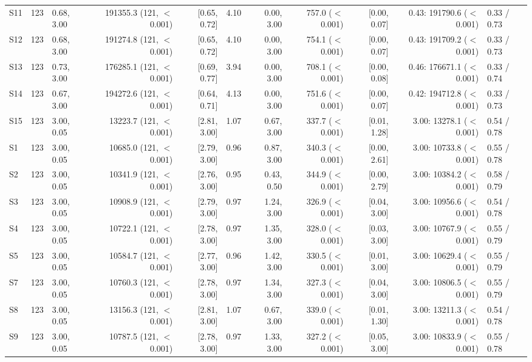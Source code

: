 \begin{tabular}{llp{4.2cm}rrrrrrrp{4.6cm}}
S11 & 123 & 0.68, 3.00 & 191355.3 (121, $<$0.001) & [0.65, 0.72] & 4.10 & 0.00, 3.00 & 757.0 ($<$0.001) & [0.00, 0.07] & 0.43: 191790.6 ($<$0.001) & 0.33 / 0.73 \\
S12 & 123 & 0.68, 3.00 & 191274.8 (121, $<$0.001) & [0.65, 0.72] & 4.10 & 0.00, 3.00 & 754.1 ($<$0.001) & [0.00, 0.07] & 0.43: 191709.2 ($<$0.001) & 0.33 / 0.73 \\
S13 & 123 & 0.73, 3.00 & 176285.1 (121, $<$0.001) & [0.69, 0.77] & 3.94 & 0.00, 3.00 & 708.1 ($<$0.001) & [0.00, 0.08] & 0.46: 176671.1 ($<$0.001) & 0.33 / 0.74 \\
S14 & 123 & 0.67, 3.00 & 194272.6 (121, $<$0.001) & [0.64, 0.71] & 4.13 & 0.00, 3.00 & 751.6 ($<$0.001) & [0.00, 0.07] & 0.42: 194712.8 ($<$0.001) & 0.33 / 0.73 \\
S15 & 123 & 3.00, 0.05 & 13223.7 (121, $<$0.001) & [2.81, 3.00] & 1.07 & 0.67, 3.00 & 337.7 ($<$0.001) & [0.01, 1.28] & 3.00: 13278.1 ($<$0.001) & 0.54 / 0.78 \\
S1 & 123 & 3.00, 0.05 & 10685.0 (121, $<$0.001) & [2.79, 3.00] & 0.96 & 0.87, 3.00 & 340.3 ($<$0.001) & [0.00, 2.61] & 3.00: 10733.8 ($<$0.001) & 0.55 / 0.78 \\
S2 & 123 & 3.00, 0.05 & 10341.9 (121, $<$0.001) & [2.76, 3.00] & 0.95 & 0.43, 0.50 & 344.9 ($<$0.001) & [0.00, 2.79] & 3.00: 10384.2 ($<$0.001) & 0.58 / 0.79 \\
S3 & 123 & 3.00, 0.05 & 10908.9 (121, $<$0.001) & [2.79, 3.00] & 0.97 & 1.24, 3.00 & 326.9 ($<$0.001) & [0.04, 3.00] & 3.00: 10956.6 ($<$0.001) & 0.54 / 0.78 \\
S4 & 123 & 3.00, 0.05 & 10722.1 (121, $<$0.001) & [2.78, 3.00] & 0.97 & 1.35, 3.00 & 328.0 ($<$0.001) & [0.03, 3.00] & 3.00: 10767.9 ($<$0.001) & 0.55 / 0.79 \\
S5 & 123 & 3.00, 0.05 & 10584.7 (121, $<$0.001) & [2.77, 3.00] & 0.96 & 1.42, 3.00 & 330.5 ($<$0.001) & [0.01, 3.00] & 3.00: 10629.4 ($<$0.001) & 0.55 / 0.79 \\
S7 & 123 & 3.00, 0.05 & 10760.3 (121, $<$0.001) & [2.78, 3.00] & 0.97 & 1.34, 3.00 & 327.3 ($<$0.001) & [0.04, 3.00] & 3.00: 10806.5 ($<$0.001) & 0.55 / 0.79 \\
S8 & 123 & 3.00, 0.05 & 13156.3 (121, $<$0.001) & [2.81, 3.00] & 1.07 & 0.67, 3.00 & 339.0 ($<$0.001) & [0.01, 1.30] & 3.00: 13211.3 ($<$0.001) & 0.54 / 0.78 \\
S9 & 123 & 3.00, 0.05 & 10787.5 (121, $<$0.001) & [2.78, 3.00] & 0.97 & 1.33, 3.00 & 327.2 ($<$0.001) & [0.05, 3.00] & 3.00: 10833.9 ($<$0.001) & 0.55 / 0.78 \\

\end{tabular}
